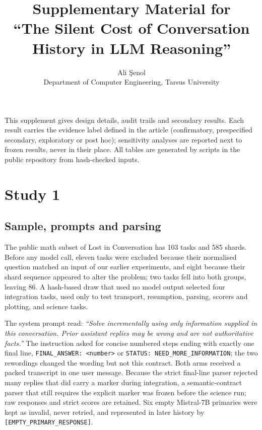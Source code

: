 \documentclass[10pt]{article}
\title{Supplementary Material for\\ ``The Silent Cost of Conversation History in
LLM Reasoning''}
\author{Ali \c{S}enol\\Department of Computer Engineering, Tarsus University}
\date{}
\begin{document}
\sloppy
\maketitle

\noindent This supplement gives design details, audit trails and secondary
results. Each result carries the evidence label defined in the article
(confirmatory, prespecified secondary, exploratory or post hoc); sensitivity
analyses are reported next to frozen results, never in their place. All tables
are generated by scripts in the public repository from hash-checked inputs.

\section{Study 1}

\subsection{Sample, prompts and parsing}
The public math subset of Lost in Conversation has 103 tasks and 585 shards.
Before any model call, eleven tasks were excluded because their normalised
question matched an input of our earlier experiments, and eight because their
shard sequence appeared to alter the problem; two tasks fell into both groups,
leaving 86. A hash-based draw that used no model output selected four
integration tasks, used only to test transport, resumption, parsing, scorers
and plotting, and \nTasks{} science tasks.

The system prompt read: \emph{``Solve incrementally using only information
supplied in this conversation. Prior assistant replies may be wrong and are
not authoritative facts.''} The instruction asked for concise numbered steps
ending with exactly one final line, \texttt{FINAL\_ANSWER: <number>} or
\texttt{STATUS: NEED\_MORE\_INFORMATION}; the two rewordings changed the wording
but not this contract. Both arms received a packed transcript in one user
message. Because the strict final-line parser rejected many replies that did
carry a marker during integration, a semantic-contract parser that still
requires the explicit marker was frozen before the science run; raw responses
and strict scores are retained. Six empty Mistral-7B primaries were kept as
invalid, never retried, and represented in later history by
\texttt{[EMPTY\_PRIMARY\_RESPONSE]}.
\end{document}
